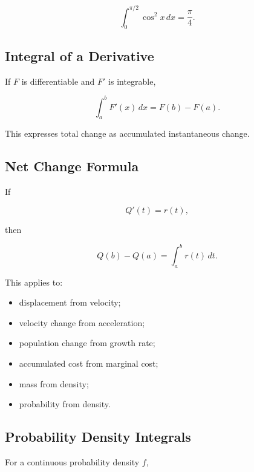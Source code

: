 \[
\boxed{
\int_0^{\pi/2}
\cos^2x\,dx
=
\frac{\pi}{4}.
}
\]

\subsection{Integral of a Derivative}
\label{subsec:integral-of-derivative}

If \(F\) is differentiable and \(F'\) is integrable,

\[
\boxed{
\int_a^b
F'(x)
\,dx
=
F(b)-F(a).
}
\]

This expresses total change as accumulated instantaneous change.

\subsection{Net Change Formula}
\label{subsec:net-change-integral}

If

\[
Q'(t)=r(t),
\]

then

\[
\boxed{
Q(b)-Q(a)
=
\int_a^b r(t)\,dt.
}
\]

This applies to:

\begin{itemize}
    \item displacement from velocity;
    \item velocity change from acceleration;
    \item population change from growth rate;
    \item accumulated cost from marginal cost;
    \item mass from density;
    \item probability from density.
\end{itemize}

\subsection{Probability Density Integrals}
\label{subsec:probability-density-integrals}

For a continuous probability density \(f\),

